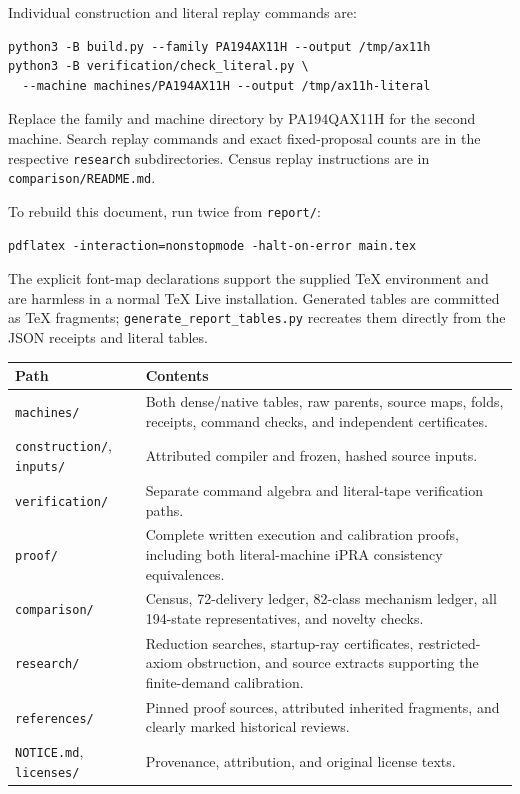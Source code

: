 \documentclass[11pt,a4paper]{article}
\newcommand{\file}[1]{\texttt{\nolinkurl{#1}}}
\begin{document}
Individual construction and literal replay commands are:
\begin{verbatim}
python3 -B build.py --family PA194AX11H --output /tmp/ax11h
python3 -B verification/check_literal.py \
  --machine machines/PA194AX11H --output /tmp/ax11h-literal
\end{verbatim}
Replace the family and machine directory by PA194QAX11H for the second
machine. Search replay commands and exact fixed-proposal counts are
in the respective \file{research} subdirectories. Census replay
instructions are in \file{comparison/README.md}.

To rebuild this document, run twice from \file{report/}:
\begin{verbatim}
pdflatex -interaction=nonstopmode -halt-on-error main.tex
\end{verbatim}
The explicit font-map declarations support the supplied TeX environment
and are harmless in a normal TeX Live installation. Generated tables
are committed as TeX fragments; \file{generate_report_tables.py}
recreates them directly from the JSON receipts and literal tables.

\begin{center}
\begin{tabular}{@{}p{}p{}@{}}
\toprule
Path & Contents\\\midrule
\file{machines/} & Both dense/native tables, raw parents, source maps, folds, receipts, command checks, and independent certificates.\\
\file{construction/}, \file{inputs/} & Attributed compiler and frozen, hashed source inputs.\\
\file{verification/} & Separate command algebra and literal-tape verification paths.\\
\file{proof/} & Complete written execution and calibration proofs, including both literal-machine iPRA consistency equivalences.\\
\file{comparison/} & Census, 72-delivery ledger, 82-class mechanism ledger, all 194-state representatives, and novelty checks.\\
\file{research/} & Reduction searches, startup-ray certificates, restricted-axiom obstruction, and source extracts supporting the finite-demand calibration.\\
\file{references/} & Pinned proof sources, attributed inherited fragments, and clearly marked historical reviews.\\
\file{NOTICE.md}, \file{licenses/} & Provenance, attribution, and original license texts.\\
\bottomrule
\end{tabular}
\end{center}
\end{document}
